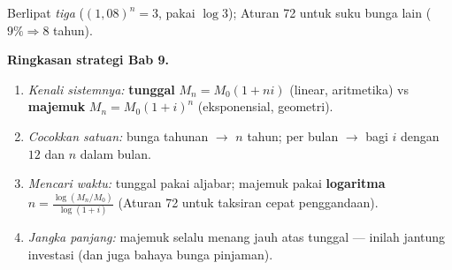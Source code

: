 \begin{variasi}
Berlipat \emph{tiga} ($(1{,}08)^n=3$, pakai $\log3$); Aturan 72 untuk suku bunga
lain ($9\%\Rightarrow8$ tahun).
\end{variasi}

\begin{tips}
\textbf{Ringkasan strategi Bab 9.}
\begin{enumerate}[leftmargin=*,topsep=2pt]
  \item \emph{Kenali sistemnya:} \textbf{tunggal} $M_n=M_0(1+ni)$ (linear,
  aritmetika) vs \textbf{majemuk} $M_n=M_0(1+i)^n$ (eksponensial, geometri).
  \item \emph{Cocokkan satuan:} bunga tahunan $\to$ $n$ tahun; per bulan $\to$
  bagi $i$ dengan $12$ dan $n$ dalam bulan.
  \item \emph{Mencari waktu:} tunggal pakai aljabar; majemuk pakai
  \textbf{logaritma} $n=\frac{\log(M_n/M_0)}{\log(1+i)}$ (Aturan 72 untuk taksiran
  cepat penggandaan).
  \item \emph{Jangka panjang:} majemuk selalu menang jauh atas tunggal --- inilah
  jantung investasi (dan juga bahaya bunga pinjaman).
\end{enumerate}
\end{tips}


